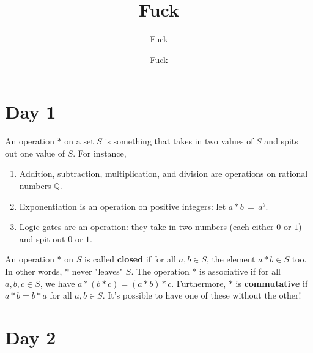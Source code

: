 \documentclass[11pt]{article}
\title{Fuck}
\author{Fuck}
\date{Fuck}
\begin{document}
\maketitle
\tableofcontents
\newpage


\section{Day 1}

An operation $\ast$ on a set $S$ is something that takes in two values of $S$ and spits out one value of $S$. For instance,
\begin{enumerate}
  \item Addition, subtraction, multiplication, and division are operations on rational numbers $\mathbb{Q}$.
  \item Exponentiation is an operation on positive integers: let $a \ast b \, = \, a^{b}$.
  \item Logic gates are an operation: they take in two numbers (each either $0$ or $1$) and spit out $0$ or $1$.
\end{enumerate}
An operation $\ast$ on $S$ is called \textbf{closed} if for all $a, b \in S$, the element $a \ast b \in S$ too. In other words, $\ast$ never "leaves" $S$. The operation $\ast$ is associative if for all $a, b, c \in S$, we have $a \ast (b \ast c) = (a \ast b) \ast c$. Furthermore, $\ast$ is \textbf{commutative} if $a \ast b = b \ast a$ for all $a, b \in S$. It's possible to have one of these without the other! 



\section{Day 2}
\end{document}
